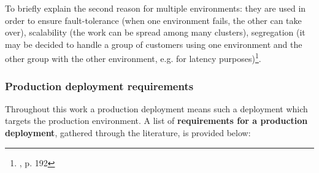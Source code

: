 To briefly explain the second reason for multiple environments: they are used in order to ensure fault-tolerance (when one environment fails, the other can take over), scalability (the work can be spread among many clusters), segregation (it may be decided to handle a group of customers using one environment and the other group with the other environment, e.g. for latency purposes)\footnote{\cite{book-iac}, p. 192}.

\subsubsection{Production deployment requirements}
Throughout this work a production deployment means such a deployment which targets the production environment. A list of \textbf{requirements for a production deployment}, gathered through the literature, is provided below:
